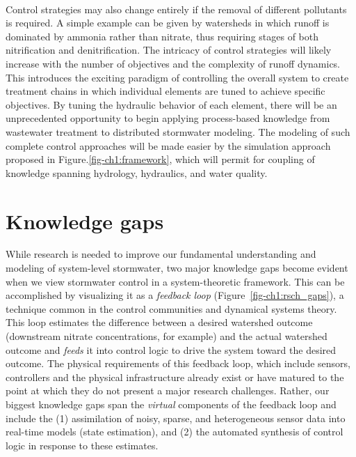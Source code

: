 \

Control strategies may also change entirely if the removal of different pollutants is required. 
A simple example can be given by watersheds in which runoff is dominated by ammonia rather than nitrate, thus requiring stages of both nitrification and denitrification. 
The intricacy of control strategies will likely increase with the
  number of objectives\cite{Tillinghast_2012} and the complexity of runoff dynamics. This introduces the exciting paradigm of controlling the overall system to create treatment chains in which individual elements are tuned to achieve specific objectives. 
By tuning the hydraulic behavior of each element, there will be an unprecedented opportunity to begin applying process-based knowledge from wastewater treatment to distributed stormwater modeling. 
The modeling of such complete control approaches will be made easier by the simulation approach proposed in Figure.\ref{fig-ch1:framework}, which will permit for coupling of knowledge spanning hydrology, hydraulics, and water quality.  


\section{Knowledge gaps}
While research is needed to improve our fundamental understanding and modeling of system-level stormwater, two major knowledge gaps become evident when we view stormwater control in a system-theoretic framework. This can be accomplished by visualizing it as a \textit{feedback loop} (Figure~\ref{fig-ch1:rsch_gaps}), a technique common in the control communities and dynamical systems theory\cite{Ogata201}. This loop estimates the difference between a desired watershed outcome (downstream nitrate concentrations, for example) and the actual watershed outcome and \textit{feeds} it into control logic to drive the system toward the desired outcome. The physical requirements of this feedback loop, which include sensors, controllers and the physical infrastructure already exist or have matured to the point at which they  do not present a major research challenges. Rather, our biggest knowledge gaps span the \textit{virtual} components of the feedback loop and include the (1) assimilation of noisy, sparse, and heterogeneous sensor data into real-time models (state estimation), and (2) the automated synthesis of control logic in response to these estimates. 

